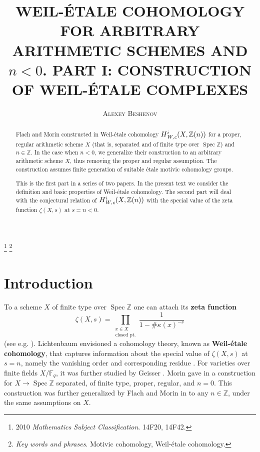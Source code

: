 \documentclass[leqno,12pt]{article}
\title{\uppercase{Weil-étale cohomology for arbitrary arithmetic schemes and $n < 0$.
  Part I: Construction of Weil-étale complexes}}
\author{\textsc{Alexey Beshenov}}
\date{}
\theoremstyle{plain}
\theoremstyle{definition}
\DeclareMathOperator{\Spec}{Spec}
\newcommand{\ZZ}{\mathbb{Z}}
\newcommand{\FF}{\mathbb{F}}
\newcommand{\Wc}{\text{\it W,c}}
\begin{document}
\maketitle

\footnote{ %
2010 \textit{Mathematics Subject Classification}.
14F20, 14F42.}
\footnote{ %
  \textit{Key words and phrases}.
  Motivic cohomology, Weil-\'{e}tale cohomology.}


\begin{abstract}
  Flach and Morin constructed in \cite{Flach-Morin-2018} Weil-\'{e}tale
  cohomology $H^i_\Wc (X, \ZZ(n))$ for a proper, regular arithmetic
  scheme $X$ (that is, separated and of finite type over $\Spec \ZZ$) and
  $n \in \ZZ$. In the case when $n < 0$, we generalize their construction to an
  arbitrary arithmetic scheme $X$, thus removing the proper and regular
  assumption. The construction assumes finite generation of suitable \'{e}tale
  motivic cohomology groups.

  This is the first part in a series of two papers. In the present text we
  consider the definition and basic properties of Weil-\'{e}tale cohomology. The
  second part will deal with the conjectural relation of $H^i_\Wc (X, \ZZ(n))$
  with the special value of the zeta function $\zeta (X,s)$ at $s = n < 0$.
\end{abstract}

\section{Introduction}

To a scheme $X$ of finite type over $\Spec \ZZ$ one can attach its
\textbf{zeta function}
$$\zeta (X,s) = \prod_{\substack{x \in X \\ \text{closed pt.}}} \frac{1}{1 - \#\kappa (x)^{-s}}$$
(see e.g. \cite{Serre-1965}). Lichtenbaum envisioned a cohomology theory, known
as \textbf{Weil-\'{e}tale cohomology}, that captures information about the special
value of $\zeta (X,s)$ at $s = n$, namely the vanishing order and corresponding
residue
\cite{Lichtenbaum-2005,Lichtenbaum-2009-number-rings,Lichtenbaum-2009-Euler-char}.
For varieties over finite fields $X/\FF_q$, it was further studied by Geisser
\cite{Geisser-2004,Geisser-2006,Geisser-2010-arithmetic-homology}.
Morin gave in \cite{Morin-2014} a construction for $X \to \Spec\ZZ$ separated,
of finite type, proper, regular, and $n = 0$. This construction was further
generalized by Flach and Morin in \cite{Flach-Morin-2018} to any $n \in \ZZ$,
under the same assumptions on $X$.
\end{document}
